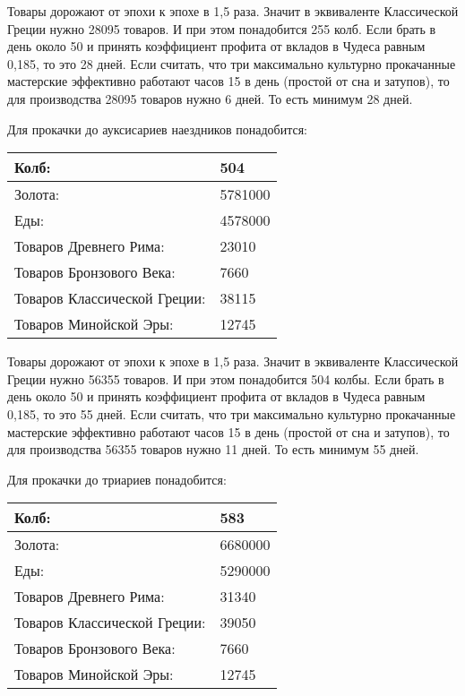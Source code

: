 Товары дорожают от эпохи к эпохе в 1,5 раза.
Значит в эквиваленте Классической Греции нужно 28095 товаров.
И при этом понадобится 255 колб. Если брать в день около 50 и принять коэффициент профита от вкладов
в Чудеса равным 0,185, то это 28 дней.
Если считать, что три максимально культурно прокачанные мастерские эффективно работают часов 15 в день (простой от сна и затупов),
то для производства 28095 товаров нужно 6 дней.
То есть минимум 28 дней.


Для прокачки до ауксисариев наездников понадобится:

\begin{center}
    \begin{tabular}[h!]{|l|l|}
        \hline
        Колб:   & 504 \\\hline
        Золота: & 5781000 \\\hline
        Еды:    & 4578000 \\\hline
        Товаров Древнего Рима: & 23010 \\\hline
        Товаров Бронзового Века: & 7660 \\\hline
        Товаров Классической Греции: & 38115 \\\hline
        Товаров Минойской Эры: & 12745 \\\hline
    \end{tabular}
\end{center}

Товары дорожают от эпохи к эпохе в 1,5 раза.
Значит в эквиваленте Классической Греции нужно 56355 товаров.
И при этом понадобится 504 колбы. Если брать в день около 50 и принять коэффициент профита от вкладов
в Чудеса равным 0,185, то это 55 дней.
Если считать, что три максимально культурно прокачанные мастерские эффективно работают часов 15 в день (простой от сна и затупов),
то для производства 56355 товаров нужно 11 дней.
То есть минимум 55 дней.


Для прокачки до триариев понадобится:

\begin{center}
    \begin{tabular}[h!]{|l|l|}
        \hline
        Колб:   & 583 \\\hline
        Золота: & 6680000 \\\hline
        Еды:    & 5290000 \\\hline
        Товаров Древнего Рима: & 31340 \\\hline
        Товаров Классической Греции: & 39050 \\\hline
        Товаров Бронзового Века: & 7660 \\\hline
        Товаров Минойской Эры: & 12745 \\\hline
    \end{tabular}
\end{center}

